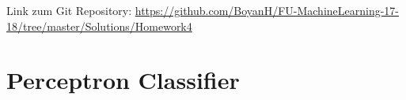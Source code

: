 \usepackage{graphicx}
\usepackage{amsmath}
\usepackage{amssymb}
\usepackage{fancyvrb}

\newcommand{\dozent}{Prof. R. Rojas}					%
\newcommand{\projectNo}{4}
\newcommand{\veranstaltung}{Mustererkennung}
\newcommand{\semester}{WS17/18}
\newcommand{\studenten}{Boyan Hristov, Nedeltscho Petrov}





Link zum Git Repository: \url{https://github.com/BoyanH/FU-MachineLearning-17-18/tree/master/Solutions/Homework\projectNo}

\section*{Perceptron Classifier}





